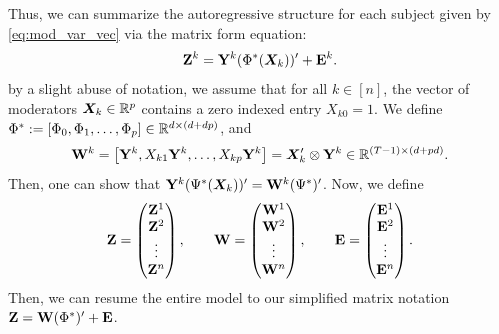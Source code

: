 Thus, we can summarize the autoregressive structure for each subject given by \eqref{eq:mod_var_vec} via the matrix form equation:
\begin{equation*}
    \mathbf{Z}^{k} = \mathbf{Y}^{k} (\Phi^*(\bm{X}_k))' + \mathbf{E}^{k}.
\end{equation*}
by a slight abuse of notation, we assume that for all $k\in[n]$, the vector of moderators $\bm{X}_k\in\mathbb{R}^p$ contains a zero indexed entry $X_{k0} = 1$. We define $\Phi^* := [\Phi_0,\Phi_1,\ldots,\Phi_p]\in\mathbb{R}^{d\times (d+dp)}$, and 
\begin{equation*}
    \mathbf{W}^{k} = \left[\mathbf{Y}^k , X_{k1}\mathbf{Y}^k , \dots , X_{kp}\mathbf{Y}^k \right] = \bm{X}_k' \otimes \mathbf{Y}^k \in \mathbb{R}^{(T-1) \times (d + pd)}.
\end{equation*}
Then, one can show that $\mathbf{Y}^{k} (\Psi^*(\bm{X}_k))' = \mathbf{W}^{k} (\Psi^*)'$. Now, we define
\begin{equation}
    \mathbf{Z} = \begin{pmatrix}
        \mathbf{Z}^{1}\\ \mathbf{Z}^{2} \\ \vdots \\ \mathbf{Z}^{n}
    \end{pmatrix}, \hspace{7mm}
    \mathbf{W} =  \begin{pmatrix}
        \mathbf{W}^{1} \\ \mathbf{W}^{2} \\ \vdots \\ \mathbf{W}^{n}  
    \end{pmatrix}, \hspace{7mm}
    \mathbf{E} =  \begin{pmatrix}
        \mathbf{E}^{1} \\ \mathbf{E}^{2} \\ \vdots \\ \mathbf{E}^{n} 
    \end{pmatrix}.
\end{equation}
Then, we can resume the entire model to our simplified matrix notation $\mathbf{Z} = \mathbf{W} (\Phi^*)' + \mathbf{E} $.

